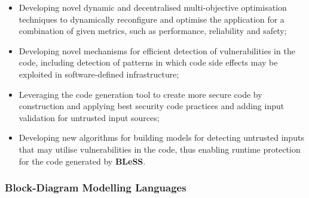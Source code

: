 \documentclass[a4paper,11pt]{article}
\newcommand{\project}[1]{\textbf{#1}\xspace}
\newcommand{\BLESS}{\project{BLeSS}}
\newcommand{\TheProject}{\BLESS}
\begin{document}
\begin{itemize}
\item Developing novel dynamic and decentralised multi-objective optimisation techniques to dynamically reconfigure and
  optimise the application for a combination of given metrics, such
  as performance, reliability and safety;
\item Developing novel mechanisms for efficient detection of vulnerabilities in the code, including detection of patterns in which code side effects may be exploited in software-defined infrastructure; 
\item Leveraging the code generation tool to create more secure code by construction and applying best security code practices and adding input validation for untrusted input sources;  
\item Developing new algorithms for building models for detecting untrusted inputs that may utilise vulnerabilities in the code, thus enabling runtime protection for the code generated by \TheProject.  
\end{itemize}





\subsubsection{Block-Diagram Modelling Languages}
\label{sect:background-first}
\label{sect:parallelDSL}
\end{document}
